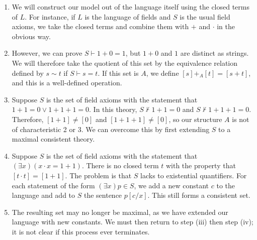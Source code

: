 \begin{enumerate}
    \item We will construct our model out of the language itself using the closed terms of $L$.
    For instance, if $L$ is the language of fields and $S$ is the usual field axioms, we take the closed terms and combine them with $+$ and $\cdot$ in the obvious way.
    \item However, we can prove $S \vdash 1 + 0 = 1$, but $1 + 0$ and $1$ are distinct as strings.
    We will therefore take the quotient of this set by the equivalence relation defined by $s \sim t$ if $S \vdash s = t$.
    If this set is $A$, we define $[s] +_A [t] = [s + t]$, and this is a well-defined operation.
    \item Suppose $S$ is the set of field axioms with the statement that $1 + 1 = 0 \vee 1 + 1 + 1 = 0$.
    In this theory, $S \not\vdash 1 + 1 = 0$ and $S \not\vdash 1 + 1 + 1 = 0$.
    Therefore, $[1+1] \neq [0]$ and $[1+1+1] \neq [0]$, so our structure $A$ is not of characteristic 2 or 3.
    We can overcome this by first extending $S$ to a maximal consistent theory.
    \item Suppose $S$ is the set of field axioms with the statement that $(\exists x)(x \cdot x = 1 + 1)$.
    There is no closed term $t$ with the property that $[t\cdot t] = [1+1]$.
    The problem is that $S$ lacks  to existential quantifiers.
    For each statement of the form $(\exists x)p \in S$, we add a new constant $c$ to the language and add to $S$ the sentence $p[c/x]$.
    This still forms a consistent set.
    \item The resulting set may no longer be maximal, as we have extended our language with new constants.
    We must then return to step (iii) then step (iv); it is not clear if this process ever terminates.
\end{enumerate}
